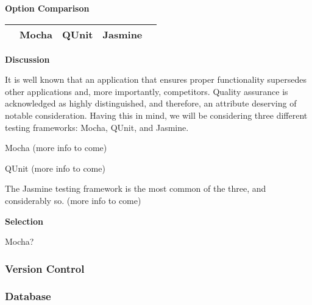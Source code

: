 \documentclass[letterpaper, 10pt, draftclsnofoot, compsoc, onecolumn]{IEEEtran}
\begin{document}
{{ \par}


\newpage
{\noindent\rmfamily\bfseries\color{black} Option Comparison \par}
\tablehead{}
\begin{supertabular}{|p{2cm}|p{2.5cm}|p{2.5cm}|p{2.5cm}|p{2.5cm}|}
\hline
& Mocha & QUnit & Jasmine\\ \hline
\end{supertabular}

\newpage
{\noindent\rmfamily\bfseries\color{black} Discussion \par}
{\noindent It is well known that an application that ensures proper functionality supersedes other applications and, more importantly, competitors. Quality assurance is acknowledged as highly distinguished, and therefore, an attribute deserving of notable consideration. Having this in mind, we will be considering three different testing frameworks: Mocha, QUnit, and Jasmine. \par}
{\noindent Mocha (more info to come) \par}
{\noindent QUnit (more info to come) \par}
{\noindent The Jasmine testing framework is the most common of the three, and considerably so. (more info to come) \par}

\medskip
{\noindent\rmfamily\bfseries\color{black} Selection \par}
{\noindent Mocha? \par}




\newpage

\medskip

\newpage
\subsubsection{Version Control}
{\noindent \par}

\medskip

\newpage
\subsubsection{Database}
{\noindent \par}

\medskip








}
\end{document}
